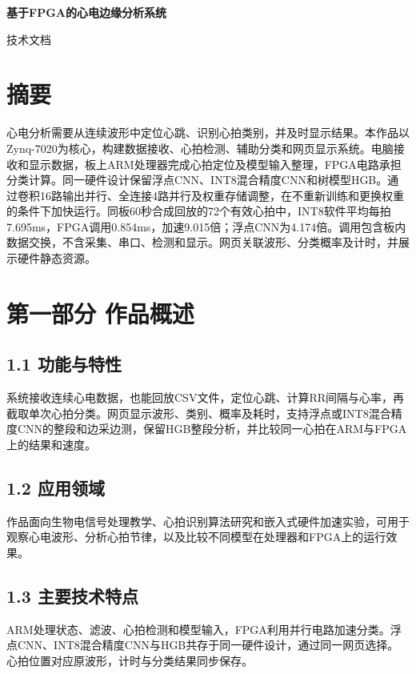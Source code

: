 \documentclass[UTF8,12pt,a4paper,fontset=none]{ctexart}
\begin{document}
\begin{center}{\bfseries 基于FPGA的心电边缘分析系统}\par 技术文档\end{center}

\section{摘要}

心电分析需要从连续波形中定位心跳、识别心拍类别，并及时显示结果。本作品以Zynq-7020为核心，构建数据接收、心拍检测、辅助分类和网页显示系统。电脑接收和显示数据，板上ARM处理器完成心拍定位及模型输入整理，FPGA电路承担分类计算。同一硬件设计保留浮点CNN、INT8混合精度CNN和树模型HGB。通过卷积16路输出并行、全连接4路并行及权重存储调整，在不重新训练和更换权重的条件下加快运行。同板60秒合成回放的72个有效心拍中，INT8软件平均每拍7.695ms，FPGA调用0.854ms，加速9.015倍；浮点CNN为4.174倍。调用包含板内数据交换，不含采集、串口、检测和显示。网页关联波形、分类概率及计时，并展示硬件静态资源。

\section{第一部分 作品概述}

\subsection{1.1 功能与特性}

系统接收连续心电数据，也能回放CSV文件，定位心跳、计算RR间隔与心率，再截取单次心拍分类。网页显示波形、类别、概率及耗时，支持浮点或INT8混合精度CNN的整段和边采边测，保留HGB整段分析，并比较同一心拍在ARM与FPGA上的结果和速度。

\subsection{1.2 应用领域}

作品面向生物电信号处理教学、心拍识别算法研究和嵌入式硬件加速实验，可用于观察心电波形、分析心拍节律，以及比较不同模型在处理器和FPGA上的运行效果。

\subsection{1.3 主要技术特点}

ARM处理状态、滤波、心拍检测和模型输入，FPGA利用并行电路加速分类。浮点CNN、INT8混合精度CNN与HGB共存于同一硬件设计，通过同一网页选择。心拍位置对应原波形，计时与分类结果同步保存。
\end{document}
